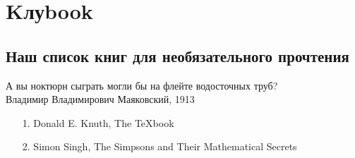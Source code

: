 \section*{Kлуbook} 
\subsection*{Наш список книг для необязательного прочтения} %
\begin{epigraph}
        А вы ноктюрн сыграть могли бы на флейте водосточных труб?\\
        {\normalfont Владимир Владимирович Маяковский, 1913}
\end{epigraph}

\begin{itemize}
        \item[1.] Donald E. Knuth, The {\TeX}book
        \item[2.] Simon Singh, The Simpsons and Their Mathematical Secrets
\end{itemize}
